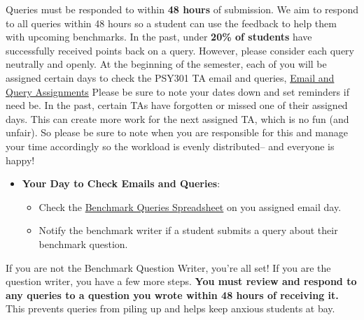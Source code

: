 \documentclass[
]{article}
\providecommand{\tightlist}{%
  \setlength{\itemsep}{0pt}\setlength{\parskip}{0pt}}
\begin{document}
Queries must be responded to within \textbf{48 hours} of submission. We aim to respond to all queries within 48 hours so a student can use the feedback to help them with upcoming benchmarks. In the past, under \textbf{20\% of students} have successfully received points back on a query. However, please consider each query neutrally and openly. At the beginning of the semester, each of you will be assigned certain days to check the PSY301 TA email and queries, \href{https://docs.google.com/spreadsheets/d/1AXT7fqusvnTBZrsaOuhRgZOQ4EmFNt0YmXQNxuAznls/edit?usp=sharing}{Email and Query Assignments} Please be sure to note your dates down and set reminders if need be. In the past, certain TAs have forgotten or missed one of their assigned days. This can create more work for the next assigned TA, which is no fun (and unfair). So please be sure to note when you are responsible for this and manage your time accordingly so the workload is evenly distributed-- and everyone is happy!

\begin{itemize}
\tightlist
\item
  \textbf{Your Day to Check Emails and Queries}:

  \begin{itemize}
  \tightlist
  \item
    Check the \href{https://docs.google.com/spreadsheets/d/1eyxaN9Psqle0u9mQ1rSq1LcSYIlrxo-ldgFzc4BlmRk/edit?usp=sharing}{Benchmark Queries Spreadsheet} on you assigned email day.\\
  \item
    Notify the benchmark writer if a student submits a query about their benchmark question.
  \end{itemize}
\end{itemize}

If you are not the Benchmark Question Writer, you're all set! If you are the question writer, you have a few more steps. \textbf{You must review and respond to any queries to a question you wrote within 48 hours of receiving it.} This prevents queries from piling up and helps keep anxious students at bay.
\end{document}
